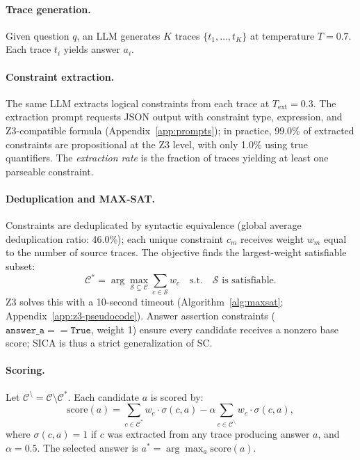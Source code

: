 \paragraph{Trace generation.} Given question $q$, an LLM generates $K$ traces $\{t_1, \ldots, t_K\}$ at temperature $T = 0.7$. Each trace $t_i$ yields answer $a_i$.

\paragraph{Constraint extraction.}\label{sec:constraint-extraction} The same LLM extracts logical constraints from each trace at $T_{\text{ext}} = 0.3$. The extraction prompt requests JSON output with constraint type, expression, and Z3-compatible formula (Appendix~\ref{app:prompts}); in practice, 99.0\% of extracted constraints are propositional at the Z3 level, with only 1.0\% using true quantifiers. The \emph{extraction rate} is the fraction of traces yielding at least one parseable constraint.

\paragraph{Deduplication and MAX-SAT.} Constraints are deduplicated by syntactic equivalence (global average deduplication ratio: 46.0\%); each unique constraint $c_m$ receives weight $w_m$ equal to the number of source traces. The objective finds the largest-weight satisfiable subset:
\begin{equation}
\label{eq:maxsat}
\mathcal{C}^* = \arg\max_{\mathcal{S} \subseteq \mathcal{C}} \sum_{c \in \mathcal{S}} w_c \quad \text{s.t.} \quad \mathcal{S} \text{ is satisfiable.}
\end{equation}
Z3 \citep{demoura2008z3} solves this with a 10-second timeout (Algorithm~\ref{alg:maxsat}; Appendix~\ref{app:z3-pseudocode}). Answer assertion constraints ($\texttt{answer\_a} == \texttt{True}$, weight 1) ensure every candidate receives a nonzero base score; SICA is thus a strict generalization of SC.

\paragraph{Scoring.} Let $\mathcal{C}^{\setminus} = \mathcal{C} \setminus \mathcal{C}^*$. Each candidate $a$ is scored by:
\begin{equation}
\label{eq:score}
\text{score}(a) = \sum_{c \in \mathcal{C}^*} w_c \cdot \sigma(c, a) - \alpha \sum_{c \in \mathcal{C}^{\setminus}} w_c \cdot \sigma(c, a),
\end{equation}
where $\sigma(c, a) = 1$ if $c$ was extracted from any trace producing answer $a$, and $\alpha = 0.5$. The selected answer is $a^* = \arg\max_{a} \text{score}(a)$.

